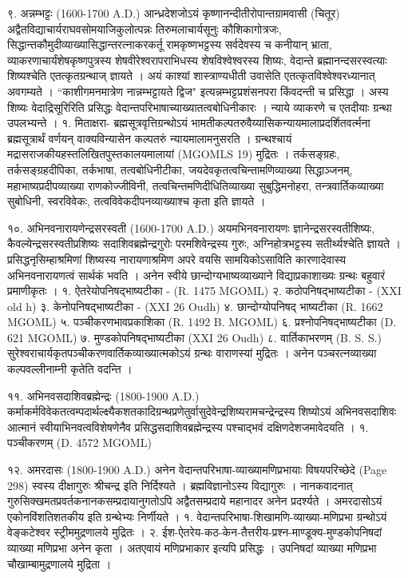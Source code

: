 ९. अन्नम्भट्टः (1600-1700 A.D.)
आन्ध्रदेशजोऽयं कृष्णानन्दीतीरोपान्तग्रामवासी (चितूर) अद्वैतविद्याचार्यराघवसोमयाजिकुलोत्पन्नः तिरुमलाचार्यसूनुः कौशिकागोत्रजः, सिद्धान्तकौमुदीव्याख्यासिद्धान्तरत्नाकरकर्तू रामकृष्णभट्टस्य सर्वदेवस्य च कनीयान् भ्राता, व्याकरणाचार्यंशेषकृष्णपुत्रस्य शेषवीरेश्वरापराभिधस्य शेषविश्वेश्वरस्य शिष्यः, वेदान्ते ब्रह्मानन्दसरस्वत्याः शिष्यश्चेति एतत्कृतग्रन्थाज् ज्ञायते । अयं काश्यां शास्त्राण्यधीती उवासेति एतत्कृतविश्वेश्वरध्यानात् अवगम्यते । ``काशीगमनमात्रेण नान्नम्भट्टायते द्विज" इत्यन्नम्भट्टप्रशंसनपरा किंवदन्ती च प्रसिद्धा । अस्य शिष्यः वेदाद्रिसूरिरिति प्रसिद्धः वेदान्तपरिभाषाच्याख्यातत्वबोधिनीकारः । न्याये व्याकरणे च एतदीयाः ग्रन्था उपलभ्यन्ते ।
१. मिताक्षरा-
ब्रह्मसूत्रवृत्तिग्रन्थोऽयं भामतीकल्पतरुवैय्यासिकन्यायमालाप्रदर्शितवर्त्मना ब्रह्मसूत्रार्थं वर्णयन् वाक्यविन्यासेन कल्पतरुं न्यायमालामनुसरति । ग्रन्थश्चायं मद्रासराजकीयहस्तलिखितपुस्तकालयमालायां (MGOMLS 19) मुद्रितः ।
तर्कसङ्ग्रहः, तर्कसङ्ग्रहदीपिका, तर्कभाषा, तत्वबोधिनीटीका, जयदेवकृतत्वचिन्तामणिव्याख्या सिद्धाञ्जनम्, महाभाष्यप्रदीपव्याख्या राणकोज्जीविनी, तत्वचिन्तमणिदीधितिव्याख्या सुबुद्धिमनोहरा, तन्त्रवार्तिकव्याख्या सुबोधिनी, स्वरविवेकः, तत्वविवेकदीपनव्याख्याश्च कृता इति ज्ञायते ।

१०. अभिनवनारायणेन्द्रसरस्वती (1600-1700 A.D.)
अयमभिनवनारायणः ज्ञानेन्द्रसरस्वतीशिष्यः, कैवल्येन्द्रसरस्वतीप्रशिष्यः सदाशिवब्रह्मेन्द्रगुरोः परमशिवेन्द्रस्य गुरुः, अग्निहोत्रभट्टस्य सतीर्थ्यश्चेति ज्ञायते । प्रसिद्धनृसिम्हाश्रमिणां शिष्यस्य नारायणाश्रमिण अपरे वयसि सामयिकोऽसाविति कारणादेवास्य अभिनवनारायणत्वं सार्थकं भवति । अनेन स्वीये छान्दोग्यभाष्यव्याख्याने विद्याप्रकाशाख्यः ग्रन्थः बहुवारं प्रमाणीकृतः ।
१. ऐतरेयोपनिषद्भाष्यटीका - (R. 1475 MGOML)
२. कठोपनिषद्भाष्यटीका - (XXI old h)
३. केनोपनिषद्भाष्यटीका - (XXI 26 Oudh)
४. छान्दोग्योपनिषद् भाष्यटीका (R. 1662 MGOML)
५. पञ्चीकरणभावप्रकाशिका (R. 1492 B. MGOML)
६. प्रश्नोपनिषद्भाष्यटीका (D. 621 MGOML)
७. मुण्डकोपनिषद्भाष्यटीका (XXI 26 Oudh)
८. वार्तिकाभरणम् (B. S. S.)
सुरेश्वराचार्यकृतपञ्चीकरणवार्तिकव्याख्यात्मकोऽयं ग्रन्थः वाराणस्यां मुद्रितः । अनेन पञ्चरत्नव्याख्या कल्पवल्लीनाम्नी कृतेति वदन्ति ।

११. अभिनवसदाशिवब्रह्मेन्द्रः (1800-1900 A.D.)
कर्माकर्मविवेकतत्वम्पदार्थल्क्ष्यैकशतकादिग्रन्थप्रणेतुर्वासुदेवेन्द्रशिष्यरामचन्द्रेन्द्रस्य शिष्योऽयं अभिनवसदाशिवः आत्मानं स्वीयाभिनवत्वविशेषणेनैव प्रसिद्धसदाशिवब्रह्मेन्द्रस्य पश्चाद्भवं दक्षिणदेशजमावेदयति ।
१. पञ्चीकरणम् (D. 4572 MGOML)

१२. अमरदासः (1800-1900 A.D.)
अनेन वेदान्तपरिभाषा-व्याख्यामणिप्रभायाः विषयपरिच्छेदे (Page 298) स्वस्य दीक्षागुरुः श्रीचन्द्र इति निर्दिश्यते । ब्रह्मविज्ञानोऽस्य विद्यागुरुः । नानकवादनात् गुरुसिक्खमतप्रवर्तकनानकसम्प्रदायानुगतोऽपि अद्वैतसम्प्रदाये महानादर अनेन प्रदर्श्यते । अमरदासोऽयं एकोनविंशतिशतकीय इति ग्रन्थेभ्यः निर्णीयते ।
१. वेदान्तपरिभाषा-शिखामणि-व्याख्या-मणिप्रभा ग्रन्थोऽयं वेङ्कटेश्वर स्ट्रीममुद्रणालये मुद्रितः ।
२. ईश-ऐतरेय-कठ-केन-तैत्तरीय-प्रश्न-माण्डूक्य-मुण्डकोपनिषदां व्याख्या मणिप्रभा अनेन कृता । अतएवायं मणिप्रभाकार इत्यपि प्रसिद्धः ।
उपनिषदां व्याख्या मणिप्रभा चौखाम्बामुद्रणालये मुद्रिता ।

